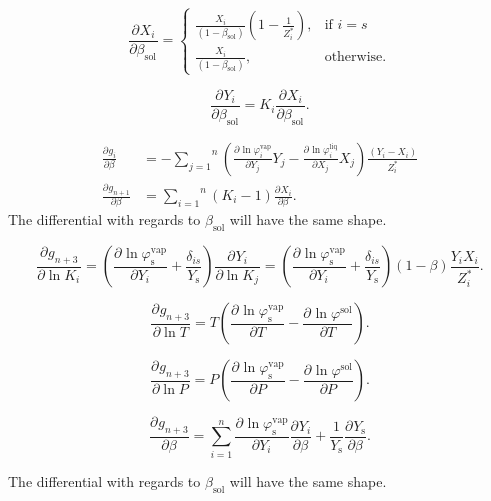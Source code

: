 \documentclass[english]{../thermomemo/thermomemo}
\newcommand*{\pd}[3][]{\frac{\partial^{#1}#2}{\partial{#3}^{#1}}}%
\newcommand{\sol}{\text{sol}}
\newcommand{\liq}{\text{liq}}
\newcommand{\vap}{\text{vap}}
\newcommand{\scomp}{\text{s}\xspace}
\begin{document}
\begin{equation}
  \pd{X_i}{\beta_\sol} = \begin{cases}
    \frac{X_i}{\left(1-\beta_\sol\right)}\left(1-\frac{1}{Z_i^*}\right),& \text{if } i = s\\
    \frac{X_i}{\left(1-\beta_\sol\right)},            & \text{otherwise}.
\end{cases}
 \end{equation}

\begin{equation}
   \pd{Y_i}{\beta_\sol} = K_i\pd{X_i}{\beta_\sol}.
\end{equation}

\begin{align}
   \pd{g_i}{\beta} &= -\overset{n}{\underset{j=1}{\sum}}\left(\pd{\ln \varphi^\vap_i}{Y_j}Y_j - \pd{\ln \varphi^\liq_i}{X_j}X_j\right)\frac{\left(Y_i - X_i\right)}{Z_i^*}\\
   \pd{g_{n+1}}{\beta} &= \overset{n}{\underset{i=1}{\sum}}\left(K_i-1\right)\pd{X_i}{\beta}.
\end{align}
The differential with regards to $\beta_\sol$ will have the same
shape.

\begin{equation}
   \pd{g_{n+3}}{\ln K_i} = \left(\pd{\ln
       \varphi^\vap_\scomp}{Y_i} +
     \frac{\delta_{is}}{Y_\scomp}\right) \pd{Y_i}{\ln K_j} = \left(\pd{\ln
       \varphi^\vap_\scomp}{Y_i} +
     \frac{\delta_{is}}{Y_\scomp}\right) \left(1-\beta\right)\frac{Y_iX_i}{Z_i^*}.
\end{equation}

\begin{equation}
   \pd{g_{n+3}}{\ln T} = T\left(\pd{\ln \varphi^\vap_\scomp}{T} - \pd{\ln \varphi^\sol}{T}\right).
\end{equation}

\begin{equation}
   \pd{g_{n+3}}{\ln P} = P\left(\pd{\ln \varphi^\vap_\scomp}{P} - \pd{\ln \varphi^\sol}{P}\right).
\end{equation}

\begin{equation}
   \pd{g_{n+3}}{\beta} = \overset{n}{\underset{i=1}{\sum}}\pd{\ln \varphi^\vap_\scomp}{Y_i}\pd{Y_i}{\beta} + \frac{1}{Y_\scomp}\pd{Y_\scomp}{\beta}.
\end{equation}

The differential with regards to $\beta_\sol$ will have the same shape.
\end{document}
